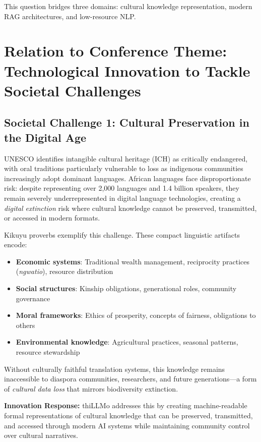 \documentclass[11pt,a4paper]{article}
\begin{document}
\vspace{5pt}

This question bridges three domains: cultural knowledge representation, modern RAG architectures, and low-resource NLP.

\newpage

\section*{Relation to Conference Theme: Technological Innovation to Tackle Societal Challenges}

\subsection*{Societal Challenge 1: Cultural Preservation in the Digital Age}

UNESCO identifies intangible cultural heritage (ICH) as critically endangered, with oral traditions particularly vulnerable to loss as indigenous communities increasingly adopt dominant languages. African languages face disproportionate risk: despite representing over 2,000 languages and 1.4 billion speakers, they remain severely underrepresented in digital language technologies, creating a \emph{digital extinction} risk where cultural knowledge cannot be preserved, transmitted, or accessed in modern formats.

Kikuyu proverbs exemplify this challenge. These compact linguistic artifacts encode:
\begin{itemize}
    \item \textbf{Economic systems}: Traditional wealth management, reciprocity practices (\emph{ngwatio}), resource distribution
    \item \textbf{Social structures}: Kinship obligations, generational roles, community governance
    \item \textbf{Moral frameworks}: Ethics of prosperity, concepts of fairness, obligations to others
    \item \textbf{Environmental knowledge}: Agricultural practices, seasonal patterns, resource stewardship
\end{itemize}

Without culturally faithful translation systems, this knowledge remains inaccessible to diaspora communities, researchers, and future generations---a form of \emph{cultural data loss} that mirrors biodiversity extinction.

\textbf{Innovation Response:} thiLLMo addresses this by creating machine-readable formal representations of cultural knowledge that can be preserved, transmitted, and accessed through modern AI systems while maintaining community control over cultural narratives.
\end{document}
